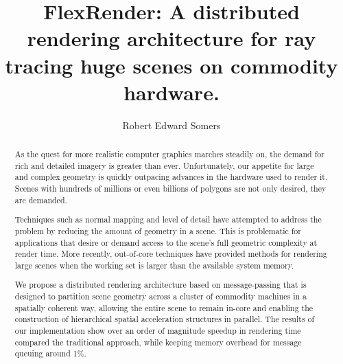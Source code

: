 \documentclass[12pt]{ucthesis}
\begin{document}

\title{FlexRender: A distributed rendering architecture for ray tracing huge
scenes on commodity hardware.}
\author{Robert Edward Somers}
  
 
     



\maketitle

\begin{frontmatter}

\copyrightpage

\committeemembershippage

\begin{abstract}

As the quest for more realistic computer graphics marches steadily on, the
demand for rich and detailed imagery is greater than ever. Unfortunately, our
appetite for large and complex geometry is quickly outpacing advances in the
hardware used to render it. Scenes with hundreds of millions or even billions
of polygons are not only desired, they are demanded.

Techniques such as normal mapping and level of detail have attempted to address
the problem by reducing the amount of geometry in a scene. This is problematic
for applications that desire or demand access to the scene's full geometric
complexity at render time. More recently, out-of-core techniques have provided
methods for rendering large scenes when the working set is larger than the
available system memory.

We propose a distributed rendering architecture based on message-passing that
is designed to partition scene geometry across a cluster of commodity machines
in a spatially coherent way, allowing the entire scene to remain in-core and
enabling the construction of hierarchical spatial acceleration structures in
parallel. The results of our implementation show over an order of magnitude
speedup in rendering time compared the traditional approach, while keeping
memory overhead for message queuing around 1\%.

\end{abstract}





\tableofcontents


\listoftables

\listoffigures

\end{frontmatter}
\end{document}
